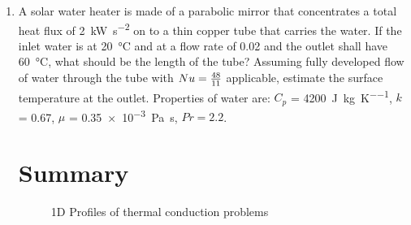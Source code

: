 \begin{enumerate}
 \item A solar water heater is made of a parabolic mirror that concentrates a total heat flux of \SI{2}{\kilo\watt\per\second\squared} on to a thin copper tube that carries the water. If the inlet water is at \SI{20}{\celsius} and at a flow rate of \SI{0.02}{\kgps} and the outlet shall have \SI{60}{\celsius}, what should be the length of the tube? Assuming fully developed flow of water through the tube with $Nu = {48 \over 11}$ applicable, estimate the surface temperature at the outlet. Properties of water are: $C_p$ = \SI{4200}{\joule\per\kilo\gram\per\kelvin}, $k$ = \SI{0.67}{\wpmk}, $\mu$ = \SI{0.35e-3}{\pascal\second}, $Pr = 2.2$.

\section{Summary}

\begin{figure}[h]
        \begin{center}
        \end{center}
        \caption{1D Profiles of thermal conduction problems}
        \label{thermalprofiles}
\end{figure}

\end{enumerate}
